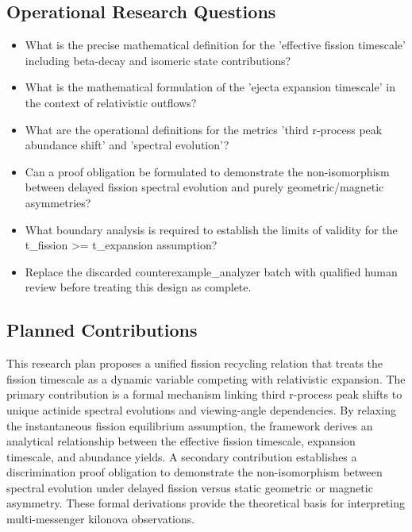 \documentclass[conference]{IEEEtran}
\begin{document}
\subsection{Operational Research Questions}
\begin{itemize}
\item What is the precise mathematical definition for the 'effective fission timescale' including beta-decay and isomeric state contributions?
\item What is the mathematical formulation of the 'ejecta expansion timescale' in the context of relativistic outflows?
\item What are the operational definitions for the metrics 'third r-process peak abundance shift' and 'spectral evolution'?
\item Can a proof obligation be formulated to demonstrate the non-isomorphism between delayed fission spectral evolution and purely geometric/magnetic asymmetries?
\item What boundary analysis is required to establish the limits of validity for the t\_fission >= t\_expansion assumption?
\item Replace the discarded counterexample\_analyzer batch with qualified human review before treating this design as complete.
\end{itemize}

\subsection{Planned Contributions}
This research plan proposes a unified fission recycling relation that treats the fission timescale as a dynamic variable competing with relativistic expansion. The primary contribution is a formal mechanism linking third r-process peak shifts to unique actinide spectral evolutions and viewing-angle dependencies. By relaxing the instantaneous fission equilibrium assumption, the framework derives an analytical relationship between the effective fission timescale, expansion timescale, and abundance yields. A secondary contribution establishes a discrimination proof obligation to demonstrate the non-isomorphism between spectral evolution under delayed fission versus static geometric or magnetic asymmetry. These formal derivations provide the theoretical basis for interpreting multi-messenger kilonova observations.
\end{document}
